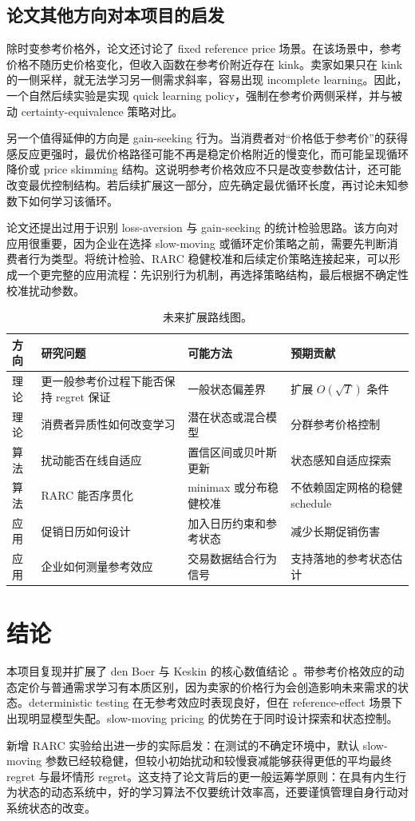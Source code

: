 \documentclass[conference]{../../LaTex_Template/IEEEtran}
\begin{document}
\subsection{论文其他方向对本项目的启发}
除时变参考价格外，论文还讨论了 fixed reference price 场景。在该场景中，参考价格不随历史价格变化，但收入函数在参考价附近存在 kink。卖家如果只在 kink 的一侧采样，就无法学习另一侧需求斜率，容易出现 incomplete learning。因此，一个自然后续实验是实现 quick learning policy，强制在参考价两侧采样，并与被动 certainty-equivalence 策略对比。

另一个值得延伸的方向是 gain-seeking 行为。当消费者对“价格低于参考价”的获得感反应更强时，最优价格路径可能不再是稳定价格附近的慢变化，而可能呈现循环降价或 price skimming 结构。这说明参考价格效应不只是改变参数估计，还可能改变最优控制结构。若后续扩展这一部分，应先确定最优循环长度，再讨论未知参数下如何学习该循环。

论文还提出过用于识别 loss-aversion 与 gain-seeking 的统计检验思路。该方向对应用很重要，因为企业在选择 slow-moving 或循环定价策略之前，需要先判断消费者行为类型。将统计检验、RARC 稳健校准和后续定价策略连接起来，可以形成一个更完整的应用流程：先识别行为机制，再选择策略结构，最后根据不确定性校准扰动参数。

\begin{table}[H]
\centering
\scriptsize
\setlength{\tabcolsep}{1pt}
\caption{未来扩展路线图。}
\label{tab:roadmap}
\begin{tabular}{p{}p{}p{}p{}}
\hline
方向 & 研究问题 & 可能方法 & 预期贡献\\
\hline
理论 & 更一般参考价过程下能否保持 regret 保证 & 一般状态偏差界 & 扩展 $O(\sqrt{T})$ 条件\\
理论 & 消费者异质性如何改变学习 & 潜在状态或混合模型 & 分群参考价格控制\\
算法 & 扰动能否在线自适应 & 置信区间或贝叶斯更新 & 状态感知自适应探索\\
算法 & RARC 能否序贯化 & minimax 或分布稳健校准 & 不依赖固定网格的稳健 schedule\\
应用 & 促销日历如何设计 & 加入日历约束和参考状态 & 减少长期促销伤害\\
应用 & 企业如何测量参考效应 & 交易数据结合行为信号 & 支持落地的参考状态估计\\
\hline
\end{tabular}
\end{table}

\section{结论}
本项目复现并扩展了 den Boer 与 Keskin 的核心数值结论 \cite{denBoerKeskin2022}。带参考价格效应的动态定价与普通需求学习有本质区别，因为卖家的价格行为会创造影响未来需求的状态。deterministic testing 在无参考效应时表现良好，但在 reference-effect 场景下出现明显模型失配。slow-moving pricing 的优势在于同时设计探索和状态控制。

新增 RARC 实验给出进一步的实际启发：在测试的不确定环境中，默认 slow-moving 参数已经较稳健，但较小初始扰动和较慢衰减能够获得更低的平均最终 regret 与最坏情形 regret。这支持了论文背后的更一般运筹学原则：在具有内生行为状态的动态系统中，好的学习算法不仅要统计效率高，还要谨慎管理自身行动对系统状态的改变。



\end{document}
